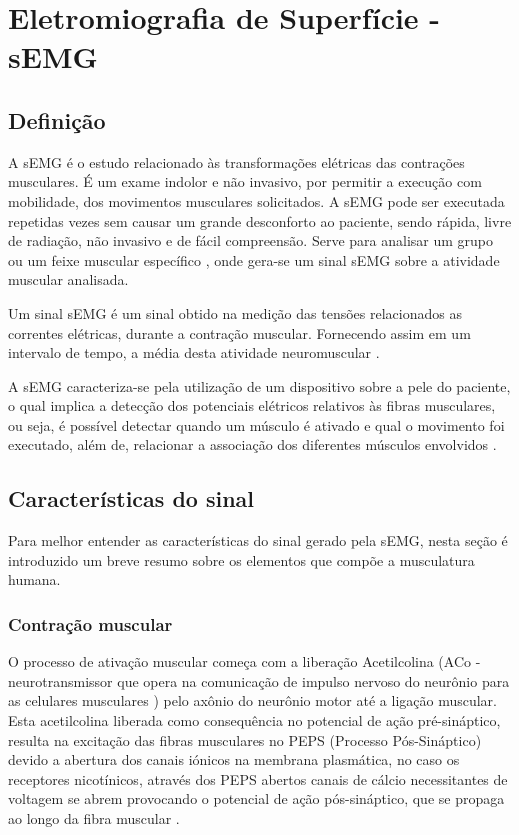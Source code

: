 \chapter{Eletromiografia de Superfície - sEMG}
\label{ch:sEMG}
\section{Definição}
A sEMG é o estudo relacionado às transformações elétricas das contrações musculares. É um exame indolor e não invasivo, por permitir a execução com mobilidade, dos movimentos musculares solicitados. A sEMG pode ser executada repetidas vezes sem causar um grande desconforto ao paciente, sendo rápida, livre de radiação, não invasivo e de fácil compreensão. Serve para analisar um grupo ou um feixe muscular específico \cite{de2010eletromiografia}, onde gera-se um sinal sEMG sobre a atividade muscular analisada.

Um sinal sEMG é um sinal obtido na medição das tensões relacionados as correntes elétricas, durante a contração muscular. Fornecendo assim em um intervalo de tempo, a média desta atividade neuromuscular \cite{reaz2006techniques}.

A sEMG caracteriza-se pela utilização de um dispositivo sobre a pele do paciente, o qual implica a detecção dos potenciais elétricos relativos às fibras musculares, ou seja, é possível detectar quando um músculo é ativado e qual o movimento foi executado, além de, relacionar a associação dos diferentes músculos envolvidos \cite{botelho2010avaliaccao}.

\section{Características do sinal}
Para melhor entender as características do sinal gerado pela sEMG, nesta seção é introduzido um breve resumo sobre os elementos que compõe a musculatura humana.

\subsection{Contração muscular}
O processo de ativação muscular começa com a liberação Acetilcolina (ACo - neurotransmissor que opera na comunicação de impulso nervoso do neurônio para as celulares musculares \cite{flores2005estructura}) pelo axônio do neurônio motor até a ligação muscular. Esta acetilcolina liberada como consequência no potencial de ação pré-sináptico, resulta na excitação das fibras musculares no PEPS (Processo Pós-Sináptico) devido a abertura dos canais iónicos na membrana plasmática, no caso os receptores nicotínicos, através dos PEPS abertos canais de cálcio necessitantes de voltagem se abrem provocando o potencial de ação pós-sináptico, que se propaga ao longo da fibra muscular \cite{da2005detecccao}.

